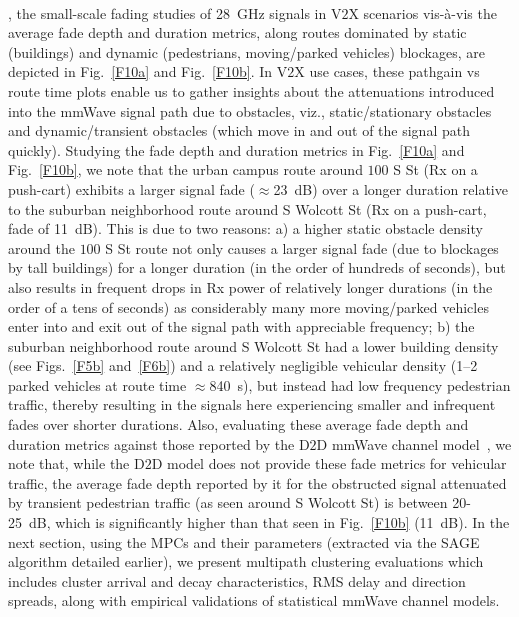 \documentclass[10pt, twocolumn]{IEEEtran}
\begin{document}
{\\, the small-scale fading studies of \SI{28}{\giga\hertz} signals in V$2$X scenarios vis-à-vis the average fade depth and duration metrics, along routes dominated by static (buildings) and dynamic (pedestrians, moving/parked vehicles) blockages, are depicted in Fig.~\ref{F10a} and Fig.~\ref{F10b}. In V$2$X use cases, these pathgain vs route time plots enable us to gather insights about the attenuations introduced into the mmWave signal path due to obstacles, viz., static/stationary obstacles and dynamic/transient obstacles (which move in and out of the signal path quickly). Studying the fade depth and duration metrics in Fig.~\ref{F10a} and Fig.~\ref{F10b}, we note that the urban campus route around $100$ S St (Rx on a push-cart) exhibits a larger signal fade (${\approx}$\SI{23}{\deci\bel}) over a longer duration relative to the suburban neighborhood route around S Wolcott St (Rx on a push-cart, fade of \SI{11}{\deci\bel}). This is due to two reasons: a) a higher static obstacle density around the $100$ S St route not only causes a larger signal fade (due to blockages by tall buildings) for a longer duration (in the order of hundreds of seconds), but also results in frequent drops in Rx power of relatively longer durations (in the order of a tens of seconds) as considerably many more moving/parked vehicles enter into and exit out of the signal path with appreciable frequency; b) the suburban neighborhood route around S Wolcott St had a lower building density (see Figs.~\ref{F5b} and~\ref{F6b}) and a relatively negligible vehicular density (\SIrange{1}{2}{} parked vehicles at route time ${\approx}$\SI{840}{\second}), but instead had low frequency pedestrian traffic, thereby resulting in the signals here experiencing smaller and infrequent fades over shorter durations. Also, evaluating these average fade depth and duration metrics against those reported by the D$2$D mmWave channel model~\cite{D2DHumanBlockage}, we note that, while the D$2$D model does not provide these fade metrics for vehicular traffic, the average fade depth reported by it for the obstructed signal attenuated by transient pedestrian traffic (as seen around S Wolcott St) is between \SI{20}{}-\SI{25}{\deci\bel}, which is significantly higher than that seen in Fig.~\ref{F10b} (\SI{11}{\deci\bel}). In the next section, using the MPCs and their parameters (extracted via the SAGE algorithm detailed earlier), we present multipath clustering evaluations which includes cluster arrival and decay characteristics, RMS delay and direction spreads, along with empirical validations of statistical mmWave channel models.
}
\end{document}
